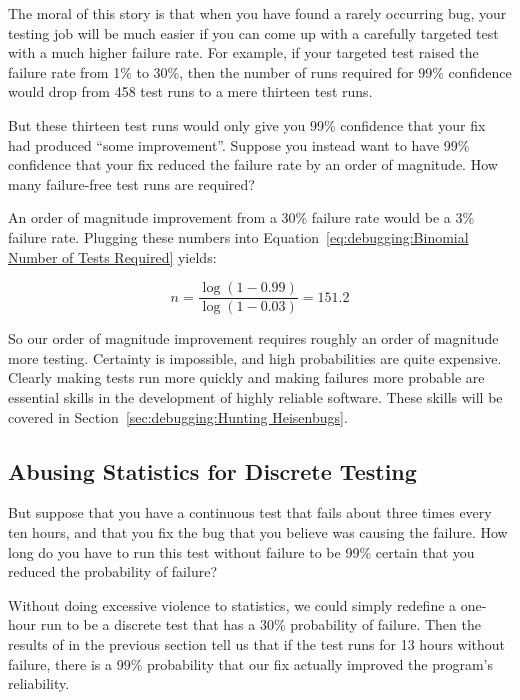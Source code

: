 The moral of this story is that when you have found a rarely occurring
bug, your testing job will be much easier if you can come up with
a carefully targeted test with a much higher failure rate.
For example, if your targeted test raised the failure rate from 1\%
to 30\%, then the number of runs required for 99\% confidence
would drop from 458 test runs to a mere thirteen test runs.

But these thirteen test runs would only give you 99\% confidence that
your fix had produced ``some improvement''.
Suppose you instead want to have 99\% confidence that your fix reduced
the failure rate by an order of magnitude.
How many failure-free test runs are required?

An order of magnitude improvement from a 30\% failure rate would be
a 3\% failure rate.
Plugging these numbers into
Equation~\ref{eq:debugging:Binomial Number of Tests Required} yields:

\begin{equation}
	n = \frac{\log\left(1 - 0.99\right)}{\log\left(1 - 0.03\right)} = 151.2
\end{equation}

So our order of magnitude improvement requires roughly an order of
magnitude more testing.
Certainty is impossible, and high probabilities are quite expensive.
Clearly making tests run more quickly and making failures more probable
are essential skills in the development of highly reliable software.
These skills will be covered in
Section~\ref{sec:debugging:Hunting Heisenbugs}.

\subsection{Abusing Statistics for Discrete Testing}
\label{sec:debugging:Abusing Statistics for Discrete Testing}

But suppose that you have a continuous test that fails about three
times every ten hours, and that you fix the bug that you believe was
causing the failure.
How long do you have to run this test without failure to be 99\% certain
that you reduced the probability of failure?

Without doing excessive violence to statistics, we could simply
redefine a one-hour run to be a discrete test that has a 30\%
probability of failure.
Then the results of in the previous section tell us that if the test
runs for 13 hours without failure, there is a 99\% probability that
our fix actually improved the program's reliability.

